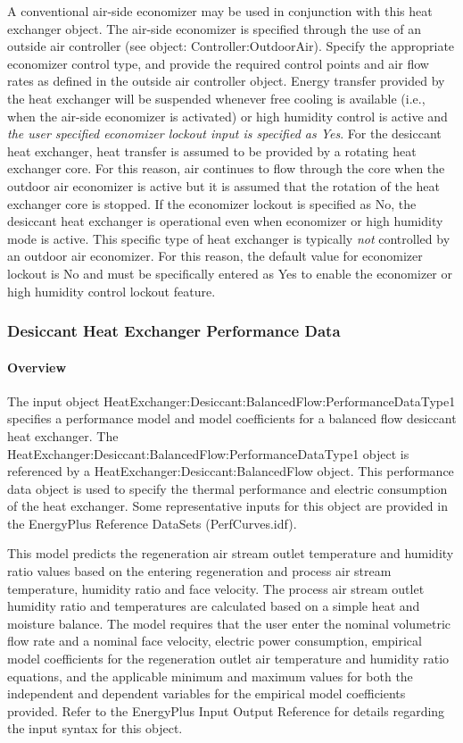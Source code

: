 A conventional air-side economizer may be used in conjunction with this heat exchanger object. The air-side economizer is specified through the use of an outside air controller (see object: Controller:OutdoorAir). Specify the appropriate economizer control type, and provide the required control points and air flow rates as defined in the outside air controller object. Energy transfer provided by the heat exchanger will be suspended whenever free cooling is available (i.e., when the air-side economizer is activated) or high humidity control is active and \emph{the user specified economizer lockout input is specified as Yes}. For the desiccant heat exchanger, heat transfer is assumed to be provided by a rotating heat exchanger core. For this reason, air continues to flow through the core when the outdoor air economizer is active but it is assumed that the rotation of the heat exchanger core is stopped. If the economizer lockout is specified as No, the desiccant heat exchanger is operational even when economizer or high humidity mode is active. This specific type of heat exchanger is typically \emph{not} controlled by an outdoor air economizer. For this reason, the default value for economizer lockout is No and must be specifically entered as Yes to enable the economizer or high humidity control lockout feature.

\subsubsection{Desiccant Heat Exchanger Performance Data}\label{desiccant-heat-exchanger-performance-data}

\paragraph{Overview}\label{overview-3-004}

The input object HeatExchanger:Desiccant:BalancedFlow:PerformanceDataType1 specifies a performance model and model coefficients for a balanced flow desiccant heat exchanger. The HeatExchanger:Desiccant:BalancedFlow:PerformanceDataType1 object is referenced by a HeatExchanger:Desiccant:BalancedFlow object. This performance data object is used to specify the thermal performance and electric consumption of the heat exchanger. Some representative inputs for this object are provided in the EnergyPlus Reference DataSets (PerfCurves.idf).

This model predicts the regeneration air stream outlet temperature and humidity ratio values based on the entering regeneration and process air stream temperature, humidity ratio and face velocity. The process air stream outlet humidity ratio and temperatures are calculated based on a simple heat and moisture balance. The model requires that the user enter the nominal volumetric flow rate and a nominal face velocity, electric power consumption, empirical model coefficients for the regeneration outlet air temperature and humidity ratio equations, and the applicable minimum and maximum values for both the independent and dependent variables for the empirical model coefficients provided. Refer to the EnergyPlus Input Output Reference for details regarding the input syntax for this object.

